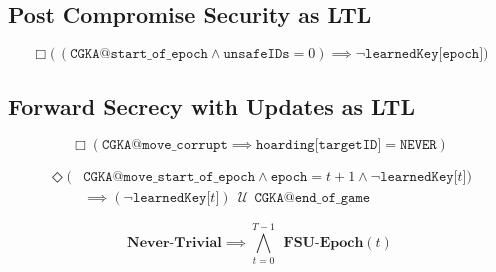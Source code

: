 \hypertarget{sec:pcs-as-ltl}{%
\subsection{Post Compromise Security as LTL}\label{sec:pcs-as-ltl}}

\begin{LTL}
\[
    \Box \Big(\, ( \texttt{CGKA@start\_of\_epoch} \land \texttt{unsafeIDs} = 0 ) \implies \neg \texttt{learnedKey[epoch]} \Big)
\]
\end{LTL}


\hypertarget{sec:fsu-as-ltl}{%
\subsection{Forward Secrecy with Updates as LTL}\label{sec:fsu-as-ltl}}

\begin{LTL}
\[
    \Box \left( \texttt{CGKA@move\_corrupt} \implies \texttt{hoarding[targetID]} = \texttt{NEVER} \right)
\]
\end{LTL}


\begin{LTL}
    \begin{equation*}
    \begin{split}
    \Diamond ( & \texttt{CGKA@move\_start\_of\_epoch} \land \texttt{epoch} = t + 1 \land \neg \texttt{learnedKey[$t$]} ) \\
    & \implies ( \neg \texttt{learnedKey[$t$]} ) \,\;{\mathcal {U}}\;\, \texttt{CGKA@end\_of\_game}
    \end{split}
    \end{equation*}
\end{LTL}

\begin{LTL}
\[
    \textbf{Never-Trivial} \implies \bigwedge\limits_{t=0}^{T-1} \;\,\textbf{FSU-Epoch}(t)
\]
\end{LTL}

